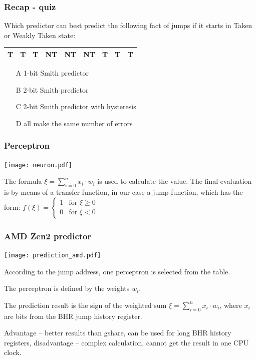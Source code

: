 \documentclass{beamer}
\begin{document}
\begin{frame}
\frametitle{Recap - quiz}

Which predictor can best predict the following fact of jumps if it starts in Taken or Weakly Taken state:

\begin{tabular}{|c|c|c|c|c|c|c|c|c|}\hline
T & T & T & NT & NT & NT& T & T & T \\ \hline
\end{tabular}

\bigskip
\begin{itemize}
 \item[A] 1-bit Smith predictor
 \item[B] 2-bit Smith predictor
 \item[C] 2-bit Smith predictor with hysteresis
 \item[D] all make the same number of errors
\end{itemize}
\end{frame}


\begin{frame}
\frametitle{Perceptron}

\begin{center}
\texttt{[image: neuron.pdf]}
\end{center}

The formula $\xi = \sum_{i=0}^{n} x_i \cdot w_i$ is used to calculate the value. The final evaluation is by means of a transfer function, in our case a jump function, which has the form:
$f(\xi) = \begin{cases}1& \text{for }\xi \ge 0\\0& \text{for }\xi <0\end{cases}$
\end{frame}


\begin{frame}
\frametitle{AMD Zen2 predictor}

\begin{center}
\texttt{[image: prediction\_amd.pdf]}
\end{center}

According to the jump address, one perceptron is selected from the table.

The perceptron is defined by the weights $w_i$.

The prediction result is the sign of the weighted sum $\xi = \sum_{i=0}^{n} x_i \cdot w_i$, where $x_i$ are bits from the BHR jump history register.

Advantage -- better results than gshare, can be used for long BHR history registers, disadvantage -- complex calculation, cannot get the result in one CPU clock.
\end{frame}
\end{document}
